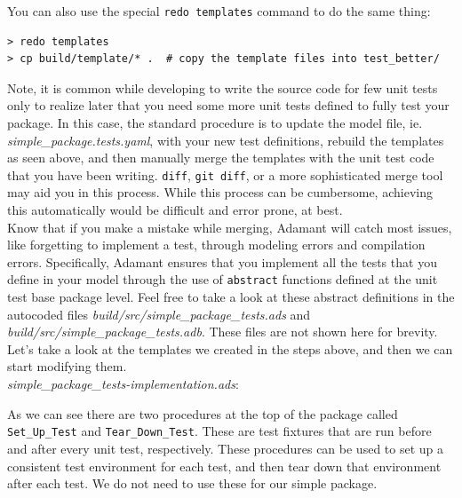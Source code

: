 You can also use the special \texttt{redo templates} command to do the same thing:

\vspace{5mm} %
\begin{verbatim}
> redo templates
> cp build/template/* .  # copy the template files into test_better/
\end{verbatim}
\vspace{5mm} %

Note, it is common while developing to write the source code for few unit tests only to realize later that you need some more unit tests defined to fully test your package. In this case, the standard procedure is to update the model file, ie. \textit{simple\_package.tests.yaml}, with your new test definitions, rebuild the templates as seen above, and then manually merge the templates with the unit test code that you have been writing. \texttt{diff}, \texttt{git diff}, or a more sophisticated merge tool may aid you in this process. While this process can be cumbersome, achieving this automatically would be difficult and error prone, at best. \\

Know that if you make a mistake while merging, Adamant will catch most issues, like forgetting to implement a test, through modeling errors and compilation errors. Specifically, Adamant ensures that you implement all the tests that you define in your model through the use of \texttt{abstract} functions defined at the unit test base package level. Feel free to take a look at these abstract definitions in the autocoded files \textit{build/src/simple\_package\_tests.ads} and \textit{build/src/simple\_package\_tests.adb}. These files are not shown here for brevity. \\

Let's take a look at the templates we created in the steps above, and then we can start modifying them. \\

\textit{simple\_package\_tests-implementation.ads}:


As we can see there are two procedures at the top of the package called \texttt{Set\_Up\_Test} and \texttt{Tear\_Down\_Test}. These are test fixtures that are run before and after every unit test, respectively. These procedures can be used to set up a consistent test environment for each test, and then tear down that environment after each test. We do not need to use these for our simple package. \\

